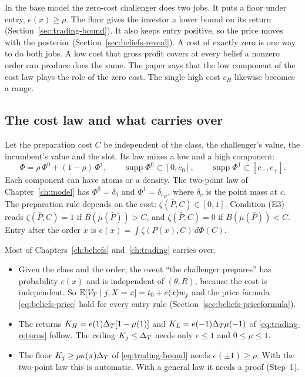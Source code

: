In the base model the zero-cost challenger does two jobs.
It puts a floor under entry, \(e(x)\ge\rho\). The floor gives the investor a lower bound on its return (Section~\ref{sec:trading-bound}).
It also keeps entry positive, so the price moves with the posterior (Section~\ref{sec:beliefs-reveal}).
A cost of exactly zero is one way to do both jobs.
A low cost that gross profit covers at every belief a nonzero order can produce does the same.
The paper says that the low component of the cost law plays the role of the zero cost.
The single high cost \(c_H\) likewise becomes a range.

\subsection{The cost law and what carries over}

Let the preparation cost \(C\) be independent of the class, the challenger's value, the incumbent's value and the slot.
Its law mixes a low and a high component:
\[
\Phi=\rho\,\Phi^0+(1-\rho)\,\Phi^1,\qquad \operatorname{supp}\Phi^0\subset[0,\bar c_0],\qquad \operatorname{supp}\Phi^1\subset[c_-,c_+].
\]
Each component can have atoms or a density.
The two-point law of Chapter~\ref{ch:model} has \(\Phi^0=\delta_0\) and \(\Phi^1=\delta_{c_H}\), where \(\delta_c\) is the point mass at \(c\).
The preparation rule depends on the cost: \(\zeta(\bar P,C)\in[0,1]\).
Condition (E3) reads \(\zeta(\bar P,C)=1\) if \(B(\bar\mu(\bar P))>C\), and \(\zeta(\bar P,C)=0\) if \(B(\bar\mu(\bar P))<C\).
Entry after the order \(x\) is \(e(x)=\int\zeta(P(x),C)\,d\Phi(C)\).

Most of Chapters~\ref{ch:beliefs} and~\ref{ch:trading} carries over.
\begin{itemize}
\item Given the class and the order, the event ``the challenger prepares'' has probability \(e(x)\) and is independent of \((\theta,R)\), because the cost is independent. So \(\mathbb{E}[V_T\mid j,X=x]=t_0+e(x)w_j\) and the price formula \eqref{eq:beliefs-price} hold for every entry rule (Section~\ref{sec:beliefs-priceformula}).
\item The returns \(K_H=e(1)\Delta_T[1-\mu(1)]\) and \(K_L=e(-1)\Delta_T\mu(-1)\) of \eqref{eq:trading-returns} follow. The ceiling \(K_j\le\Delta_T\) needs only \(e\le1\) and \(0\le\mu\le1\).
\item The floor \(K_j\ge\rho\kappa(\pi)\Delta_T\) of \eqref{eq:trading-bound} needs \(e(\pm1)\ge\rho\). With the two-point law this is automatic. With a general law it needs a proof (Step~1).
\end{itemize}

